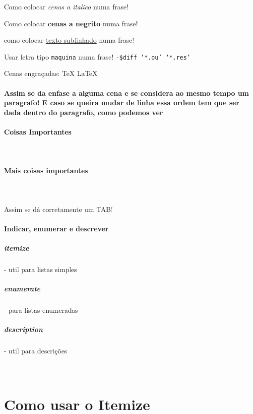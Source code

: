 \documentclass[a4paper,11pt]{article}%
\begin{document}
Como colocar \textsl {cenas a italico} numa frase!

Como colocar \textbf {cenas a negrito} numa frase! 

como colocar \underline {texto sublinhado} numa frase!

Usar letra tipo   \texttt{maquina} numa frase!
\texttt{-\$diff `*.ou' `*.res'}

Cenas engraçadas:\newline
\TeX \newline
\LaTeX 

\paragraph{Assim se da enfase a alguma cena e se considera ao mesmo tempo um paragrafo! E caso se queira mudar de linha essa ordem tem que ser dada dentro do paragrafo, como podemos ver}

\paragraph {Coisas Importantes}
\paragraph{\ \ } 
\paragraph {Mais coisas importantes}
\paragraph{\ }  

\indent Assim se dá corretamente um TAB!

\newpage
\paragraph{Indicar, enumerar e descrever}

\subparagraph{\textbf{\textsl {itemize}}} - util para listas simples
\subparagraph{\textbf{\textsl {enumerate}}} - para listas enumeradas
\subparagraph{\textbf{\textsl {description}}} - util para descrições
\paragraph{\ \ \ \ }
\section{Como usar o Itemize}
\end{document}
